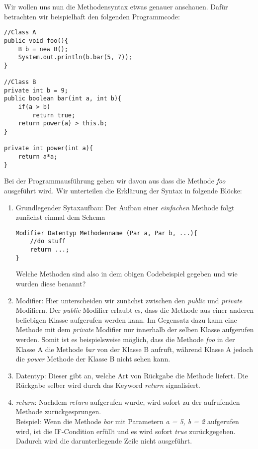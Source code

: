 \begin{Infobox}[Methodensyntax]
    Wir wollen uns nun die Methodensyntax etwas genauer anschauen. Dafür betrachten wir beispielhaft den folgenden Programmcode:
    \begin{lstlisting}[breaklines=true, numbers=none]
//Class A
public void foo(){
    B b = new B();
    System.out.println(b.bar(5, 7));
}

//Class B
private int b = 9;
public boolean bar(int a, int b){
    if(a > b)
        return true;
    return power(a) > this.b;
}

private int power(int a){
    return a*a;
}
\end{lstlisting}
Bei der Programmausführung gehen wir davon aus dass die Methode \textit{foo} ausgeführt wird. Wir unterteilen die Erklärung der Syntax in folgende Blöcke:
\begin{enumerate}[label=\roman*)]
    \item 
    Grundlegender Sytaxaufbau: Der Aufbau einer \textit{einfachen} Methode folgt zunächst einmal dem Schema 
    \begin{lstlisting}
Modifier Datentyp Methodenname (Par a, Par b, ...){
    //do stuff
    return ...;
}
    \end{lstlisting}
    Welche Methoden sind also in dem obigen Codebeispiel gegeben und wie wurden diese benannt?
    \item Modifier: Hier unterscheiden wir zunächst zwischen den \textit{public} und \textit{private} Modifiern. Der \textit{public} Modifier erlaubt es, dass die Methode aus einer
    anderen beliebigen Klasse aufgerufen werden kann. Im Gegensatz dazu kann eine Methode mit dem \textit{private} Modifier nur innerhalb der selben Klasse aufgerufen werden.
    Somit ist es beispielsweise möglich, dass die Methode \textit{foo} in der Klasse A die Methode \textit{bar} von der Klasse B aufruft, während Klasse A jedoch die \textit{power} Methode
    der Klasse B nicht sehen kann.
    \item Datentyp: Dieser gibt an, welche Art von Rückgabe die Methode liefert. Die Rückgabe selber wird durch das Keyword \textit{return} signalisiert.
    \item \textit{return}:
    Nachdem \textit{return} aufgerufen wurde, wird sofort zu der aufrufenden Methode zurückgesprungen.\\
    Beispiel: Wenn die Methode \textit{bar} mit Parametern \textit{a = 5, b = 2} aufgerufen wird, ist die IF-Condition erfüllt und es wird sofort \textit{true} zurückgegeben.
    Dadurch wird die darunterliegende Zeile nicht ausgeführt.
\end{enumerate}

\end{Infobox}
